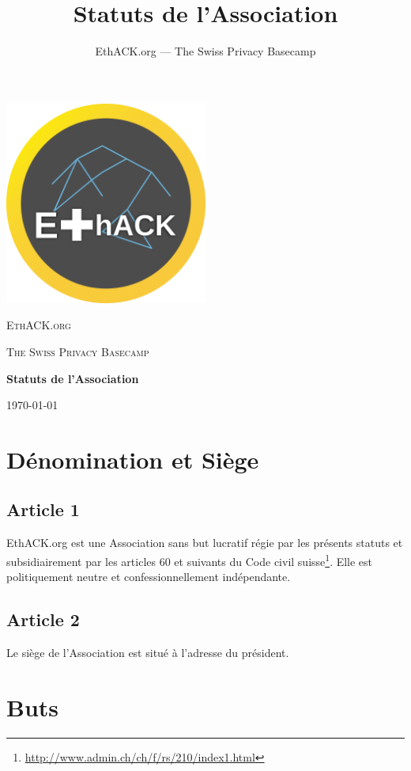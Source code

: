 \documentclass[12pt,twoside]{report}
\author{EthACK.org — The Swiss Privacy Basecamp}
\title{Statuts de l'Association}
\begin{document}
\begin{titlepage}
\centering
\includegraphics[width=0.50\textwidth]{../logo-4096.png}\par\vspace{2cm}
{\scshape\LARGE EthACK.org \par}
\vspace{1cm}
{\scshape\Large The Swiss Privacy Basecamp \par}
\vspace{1.5cm}
{\huge\bfseries Statuts de l'Association\par}

\vfill
{\large \today\par}
\end{titlepage}

\tableofcontents

\chapter*{Dénomination et Siège}

\section*{Article 1}
EthACK.org est une Association sans but lucratif régie par les présents statuts et subsidiairement par les articles 60 et suivants du Code civil suisse\footnote{\url{http://www.admin.ch/ch/f/rs/210/index1.html}}. Elle est politiquement neutre et confessionnellement indépendante.

\section*{Article 2}
Le siège de l’Association est situé à l’adresse du président.

\chapter*{Buts}
\end{document}
